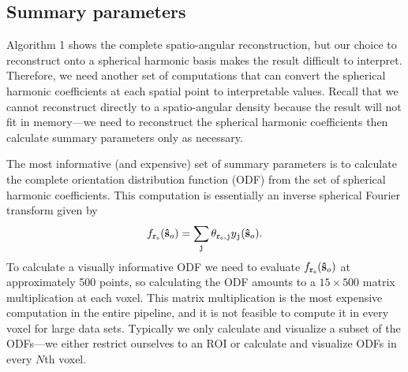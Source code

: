 \documentclass[11pt]{article}
\providecommand{\so}{\mathbf{\hat{s}}_o}
\providecommand{\tb}[1]{\textbf{#1}}
\providecommand{\ttt}[1]{\texttt{#1}}
\begin{document}
\subsection{Summary parameters}
Algorithm 1 shows the complete spatio-angular reconstruction, but our choice to
reconstruct onto a spherical harmonic basis makes the result difficult to
interpret. Therefore, we need another set of computations that can convert the
spherical harmonic coefficients at each spatial point to interpretable values.
Recall that we cannot reconstruct directly to a spatio-angular density because
the result will not fit in memory---we need to reconstruct the spherical
harmonic coefficients then calculate summary parameters only as necessary.

The most informative (and expensive) set of summary parameters is to calculate
the complete orientation distribution function (ODF) from the set of spherical
harmonic coefficients. This computation is essentially an inverse spherical Fourier
transform given by
\begin{align}
  f_{\ttt{\tb{r}}_{\ttt{o}}}(\so) =  \sum_{\ttt{j}} \theta_{\ttt{\tb{r}}_{\ttt{o}},\ttt{j}} y_{\ttt{j}}(\mathbf{\hat{s}}_{o}). \label{eq:odf}
\end{align}
To calculate a visually informative ODF we need to evaluate
$f_{\ttt{\tb{r}}_{\ttt{o}}}(\so)$ at approximately 500 points, so calculating
the ODF amounts to a $15 \times 500$ matrix multiplication at each voxel. This
matrix multiplication is the most expensive computation in the entire pipeline,
and it is not feasible to compute it in every voxel for large data sets.
Typically we only calculate and visualize a subset of the ODFs---we either
restrict ourselves to an ROI or calculate and visualize ODFs in every $N$th
voxel.
\end{document}
